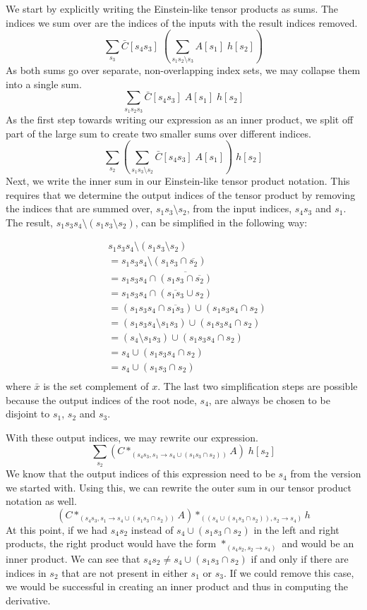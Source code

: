 \documentclass[12pt, a4paper]{report} %
\begin{document}
We start by explicitly writing the Einstein-like tensor products as sums.
The indices we sum over are the indices of the inputs with the result indices removed.
$$
\sum_{s_3} \bar{C}[s_4 s_3] \; \left( \sum_{s_1 s_2 \setminus s_3} A[s_1] \; h[s_2] \right) 
$$
As both sums go over separate, non-overlapping index sets, we may collapse them into a single sum.
$$
\sum_{s_1 s_2 s_3} \bar{C}[s_4 s_3] \; A[s_1] \; h[s_2]
$$
As the first step towards writing our expression as an inner product, we split off part of the large sum to create two smaller sums over different indices.
$$
\sum_{s_2} \left( \sum_{s_1 s_3 \setminus s_2} \bar{C}[s_4 s_3] \; A[s_1] \right) \; h[s_2]
$$
Next, we write the inner sum in our Einstein-like tensor product notation.
This requires that we determine the output indices of the tensor product by removing the indices that are summed over, $s_1 s_3 \setminus s_2$, from the input indices, $s_4 s_3$ and $s_1$.
The result, $s_1 s_3 s_4 \setminus (s_1 s_3 \setminus s_2)$, can be simplified in the following way:

\begin{align*}
&s_1 s_3 s_4 \setminus (s_1 s_3 \setminus s_2) \\
&= s_1 s_3 s_4 \setminus (s_1 s_3 \cap \overline{s_2}) \\
&= s_1 s_3 s_4 \cap \overline{(s_1 s_3 \cap \overline{s_2})} \\
&= s_1 s_3 s_4 \cap (\overline{s_1 s_3} \cup s_2) \\
&= (s_1 s_3 s_4 \cap \overline{s_1 s_3}) \cup (s_1 s_3 s_4 \cap s_2) \\
&= (s_1 s_3 s_4 \setminus s_1 s_3) \cup (s_1 s_3 s_4 \cap s_2) \\
&= (s_4 \setminus s_1 s_3) \cup (s_1 s_3 s_4 \cap s_2) \\
&= s_4 \cup (s_1 s_3 s_4 \cap s_2) \\
&= s_4 \cup (s_1 s_3 \cap s_2) \\
\end{align*}
where $\bar{x}$ is the set complement of $x$.
The last two simplification steps are possible because the output indices of the root node, $s_4$, are always be chosen to be disjoint to $s_1$, $s_2$ and $s_3$.

With these output indices, we may rewrite our expression.
$$
\sum_{s_2} (C *_{(s_4 s_3, s_1 \rightarrow s_4 \cup (s_1 s_3 \cap s_2))} A) \; h[s_2]
$$
We know that the output indices of this expression need to be $s_4$ from the version we started with.
Using this, we can rewrite the outer sum in our tensor product notation as well.
$$
(C *_{(s_4 s_3, s_1 \rightarrow s_4 \cup (s_1 s_3 \cap s_2))} A) *_{((s_4 \cup (s_1 s_3 \cap s_2)), s_2 \rightarrow s_4)} h
$$
At this point, if we had $s_4 s_2$ instead of $s_4 \cup (s_1 s_3 \cap s_2)$ in the left and right products, the right product would have the form $*_{(s_4 s_2, s_2 \rightarrow s_4)}$ and would be an inner product.
We can see that $s_4 s_2 \neq s_4 \cup (s_1 s_3 \cap s_2)$ if and only if there are indices in $s_2$ that are not present in either $s_1$ or $s_3$.
If we could remove this case, we would be successful in creating an inner product and thus in computing the derivative.
\end{document}
